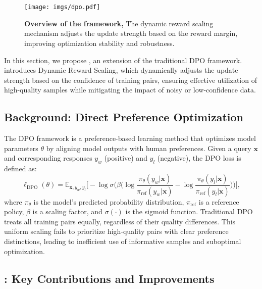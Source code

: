 \section{\dpo}

\begin{figure*}
    \centering
    \texttt{[image: imgs/dpo.pdf]}
    \caption{\textbf{Overview of the \dpo framework,} The dynamic reward scaling mechanism adjusts the update strength based on the reward margin, improving optimization stability and robustness.}
    \label{fig:dpo_alg}
\end{figure*}

In this section, we propose \dpo, an extension of the traditional DPO framework. \dpo introduces Dynamic Reward Scaling, which dynamically adjusts the update strength based on the confidence of training pairs, ensuring effective utilization of high-quality samples while mitigating the impact of noisy or low-confidence data.

\subsection{Background: Direct Preference Optimization}
The DPO framework is a preference-based learning method that optimizes model parameters $\theta$ by aligning model outputs with human preferences. Given a query $\mathbf{x}$ and corresponding responses $y_w$ (positive) and $y_l$ (negative), the DPO loss is defined as:
\begin{equation}
\ell_{\text{DPO}}(\theta) = 
\mathbb{E}_{\mathbf{x}, y_w, y_l} 
\Big[ 
    - \log \sigma \Big( 
        \beta \Big( 
            \log \frac{\pi_\theta(y_w | \mathbf{x})}{\pi_{\text{ref}}(y_w | \mathbf{x})} 
            - 
            \log \frac{\pi_\theta(y_l | \mathbf{x})}{\pi_{\text{ref}}(y_l | \mathbf{x})} 
        \Big)
    \Big)
\Big],
\end{equation}
where $\pi_\theta$ is the model's predicted probability distribution, $\pi_{\text{ref}}$ is a reference policy, $\beta$ is a scaling factor, and $\sigma(\cdot)$ is the sigmoid function. Traditional DPO treats all training pairs equally, regardless of their quality differences. This uniform scaling fails to prioritize high-quality pairs with clear preference distinctions, leading to inefficient use of informative samples and suboptimal optimization.

\subsection{\dpo: Key Contributions and Improvements}
